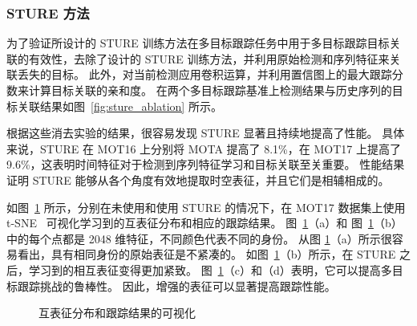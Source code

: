 \subsubsection{STURE 方法}
为了验证所设计的 STURE 训练方法在多目标跟踪任务中用于多目标跟踪目标关联的有效性，去除了设计的 STURE 训练方法，并利用原始检测和序列特征来关联丢失的目标。
此外，对当前检测应用卷积运算，并利用置信图上的最大跟踪分数来计算目标关联的亲和度。
在两个多目标跟踪基准上检测结果与历史序列的目标关联结果如图~\ref{fig:sture_ablation} 所示。

根据这些消去实验的结果，很容易发现 STURE 显著且持续地提高了性能。
具体来说，STURE 在 MOT16 上分别将 MOTA 提高了 8.1\%，在 MOT17 上提高了 9.6\%，这表明时间特征对于检测到序列特征学习和目标关联至关重要。
性能结果证明 STURE 能够从各个角度有效地提取时空表征，并且它们是相辅相成的。


如图~\ref{fig:tsne} 所示，分别在未使用和使用 STURE 的情况下，在 MOT17 数据集上使用 t-SNE~\cite{van2008visualizing} 可视化学习到的互表征分布和相应的跟踪结果。
图~\ref{fig:tsne}（a）和 图~\ref{fig:tsne}（b）中的每个点都是 2048 维特征，不同颜色代表不同的身份。
从图 \ref{fig:tsne}（a）所示很容易看出，具有相同身份的原始表征是不紧凑的。
如图~\ref{fig:tsne}（b）所示，在 STURE 之后，学习到的相互表征变得更加紧致。
图~\ref{fig:tsne}（c）和（d）表明，它可以提高多目标跟踪挑战的鲁棒性。
因此，增强的表征可以显著提高跟踪性能。


\begin{figure}[htbp]
	\centering
	
	
	
	\centering
	\caption{互表征分布和跟踪结果的可视化
	}
	\label{fig:tsne}
\end{figure}


